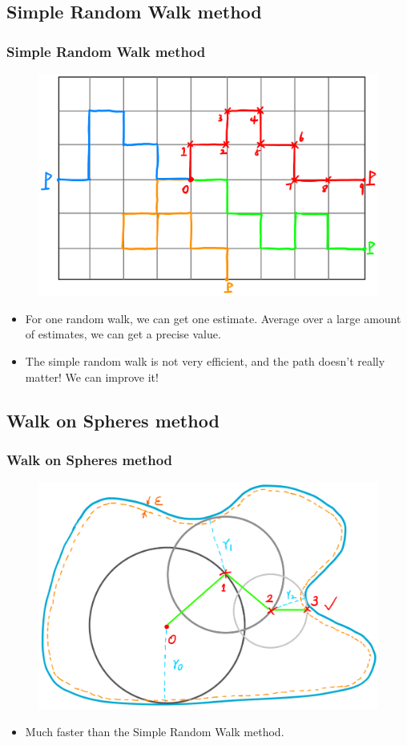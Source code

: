 \documentclass{beamer}
\begin{document}

\subsection{Simple Random Walk method}

\begin{frame}
\frametitle{Simple Random Walk method}
\begin{figure}[htbp]
    \centering
    \includegraphics[width=.6\textwidth]{./figs/srw}
\end{figure}
\begin{itemize}
    \item For one random walk, we can get one estimate. Average over a large amount of estimates, we can get a precise value.
    \item The simple random walk is not very efficient, and the path doesn't really matter! We can improve it!
\end{itemize}
\end{frame}


\subsection{Walk on Spheres method}

\begin{frame}
\frametitle{Walk on Spheres method}
\begin{figure}[htbp]
    \centering
    \includegraphics[width=.8\textwidth]{./figs/wos}
\end{figure}
\begin{itemize}
    \item Much faster than the Simple Random Walk method.
\end{itemize}
\end{frame}
\end{document}
